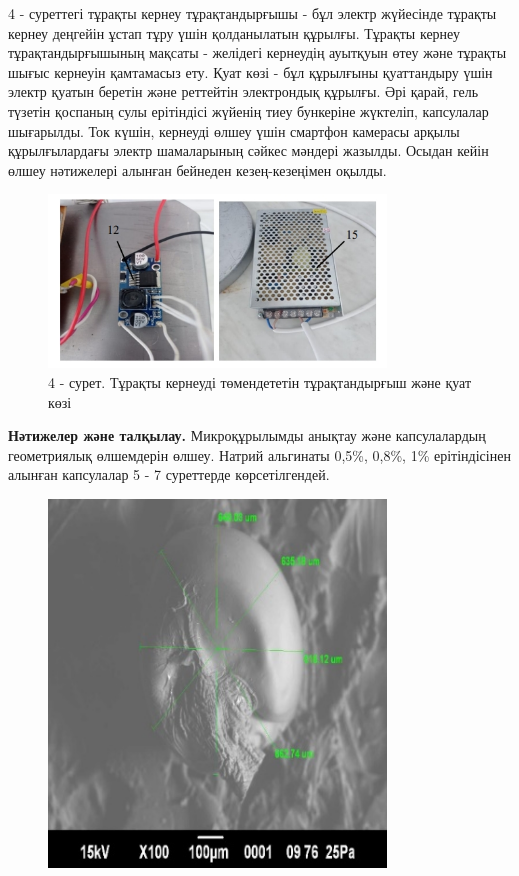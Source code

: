 \begin{multicols}{2}
4 - суреттегі тұрақты кернеу тұрақтандырғышы - бұл электр жүйесінде
тұрақты кернеу деңгейін ұстап тұру үшін қолданылатын құрылғы. Тұрақты
кернеу тұрақтандырғышының мақсаты - желідегі кернеудің ауытқуын өтеу
және тұрақты шығыс кернеуін қамтамасыз ету. Қуат көзі - бұл құрылғыны
қуаттандыру үшін электр қуатын беретін және реттейтін электрондық
құрылғы. Әрі қарай, гель түзетін қоспаның сулы ерітіндісі жүйенің тиеу
бункеріне жүктеліп, капсулалар шығарылды. Ток күшін, кернеуді өлшеу үшін
смартфон камерасы арқылы құрылғылардағы электр шамаларының сәйкес
мәндері жазылды. Осыдан кейін өлшеу нәтижелері алынған бейнеден
кезең-кезеңімен оқылды.
\end{multicols}


\begin{figure}[H]
	\centering
	\includegraphics[width=0.8\textwidth]{media/pish/image25}
	\caption*{4 - сурет. Тұрақты кернеуді төмендететін тұрақтандырғыш және қуат көзі}
\end{figure}

{\bfseries Нәтижелер және талқылау.} Микроқұрылымды анықтау және
капсулалардың геометриялық өлшемдерін өлшеу. Натрий альгинаты 0,5\%,
0,8\%, 1\% ерітіндісінен алынған капсулалар 5 - 7 суреттерде
көрсетілгендей.


\begin{figure}[H]
	\centering
	\includegraphics[width=0.8\textwidth]{media/pish/image26}
	\caption*{}
\end{figure}


